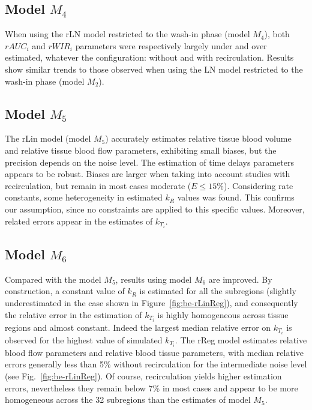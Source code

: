 \subsection{Model $M_4$}
When using the rLN model restricted to the wash-in phase (model $M_4$), both $rAUC_i$ and $rWIR_i$ parameters were respectively largely under and over estimated, whatever the configuration: without and with recirculation. Results show similar trends to those observed when using the LN model restricted to the wash-in phase (model $M_2$).

\subsection{Model $M_5$}
The rLin model (model $M_5$) accurately estimates relative tissue blood volume and relative tissue blood flow parameters, exhibiting small biases, but the precision depends on the noise level. The estimation of time delays parameters appears to be robust. Biases are larger when taking into account studies with recirculation, but remain in most cases moderate ($E \leq 15\%$). Considering rate constants, some heterogeneity in estimated $k_R$ values was found. This confirms our assumption, since no constraints are applied to this specific values. Moreover, related errors appear in the estimates of $k_{T_i}$.

\subsection{Model $M_6$}
Compared with the model $M_5$, results using model $M_6$ are improved. By construction, a constant value of $k_R$ is estimated for all the subregions (slightly underestimated in the case shown in Figure~\ref{fig:be-rLinReg}), and consequently the relative error in the estimation of $k_{T_i}$ is highly homogeneous across tissue regions and almost constant. Indeed the largest median relative error on $k_{T_i}$ is observed for the highest value of simulated $k_{T_i}$. The rReg model estimates relative blood flow parameters and relative blood tissue parameters, with median relative errors generally less than 5\% without recirculation for the intermediate noise level (see Fig.~\ref{fig:be-rLinReg}). Of course, recirculation yields higher estimation errors, nevertheless they remain below 7\% in most cases and appear to be more homogeneous across the 32 subregions than the estimates of model $M_5$. 

